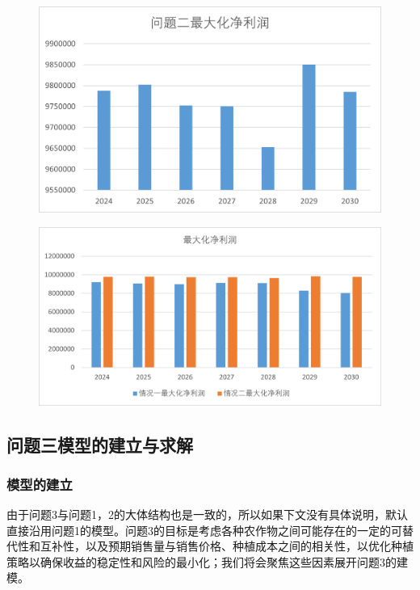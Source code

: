 \documentclass{cumcmthesis}
\begin{document}
\begin{figure}[H]
    \centering
    \begin{minipage}{0.49\textwidth}  %
        \centering
        \includegraphics[width=0.9\linewidth]{4.png}  %
        \label{fig:profit_case2}
    \end{minipage}\hfill  %
    \begin{minipage}{0.49\textwidth}  %
        \centering
        \includegraphics[width=0.9\linewidth]{5.png}  %
        \label{fig:profit_case2_1_1}
    \end{minipage}
    \caption{}
\end{figure}


\subsection{问题三模型的建立与求解}
\subsubsection{模型的建立}
由于问题3与问题1，2的大体结构也是一致的，所以如果下文没有具体说明，默认直接沿用问题1的模型。问题3的目标是考虑各种农作物之间可能存在的一定的可替代性和互补性，以及预期销售量与销售价格、种植成本之间的相关性，以优化种植策略以确保收益的稳定性和风险的最小化；我们将会聚焦这些因素展开问题3的建模。
\end{document}
